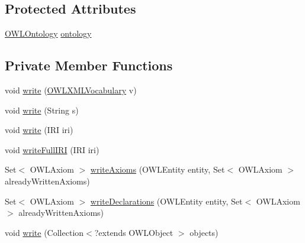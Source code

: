 \subsection*{Protected Attributes}
\begin{DoxyCompactItemize}
\item 
\hyperlink{interfaceorg_1_1semanticweb_1_1owlapi_1_1model_1_1_o_w_l_ontology}{O\-W\-L\-Ontology} \hyperlink{classorg_1_1coode_1_1owlapi_1_1functionalrenderer_1_1_o_w_l_object_renderer_a3f48ba1c8438ae6385bf0964ac3fcb12}{ontology}
\end{DoxyCompactItemize}
\subsection*{Private Member Functions}
\begin{DoxyCompactItemize}
\item 
void \hyperlink{classorg_1_1coode_1_1owlapi_1_1functionalrenderer_1_1_o_w_l_object_renderer_a613b6053f591adee1d4b85b161ccb8af}{write} (\hyperlink{enumorg_1_1semanticweb_1_1owlapi_1_1vocab_1_1_o_w_l_x_m_l_vocabulary}{O\-W\-L\-X\-M\-L\-Vocabulary} v)
\item 
void \hyperlink{classorg_1_1coode_1_1owlapi_1_1functionalrenderer_1_1_o_w_l_object_renderer_add3f553e3322651efa98df472cb96ecd}{write} (String s)
\item 
void \hyperlink{classorg_1_1coode_1_1owlapi_1_1functionalrenderer_1_1_o_w_l_object_renderer_aa4e258019df0e90df6ced0e8cb2e6482}{write} (I\-R\-I iri)
\item 
void \hyperlink{classorg_1_1coode_1_1owlapi_1_1functionalrenderer_1_1_o_w_l_object_renderer_a71ffc68dea9fa4e534041abdf5f13e38}{write\-Full\-I\-R\-I} (I\-R\-I iri)
\item 
Set$<$ O\-W\-L\-Axiom $>$ \hyperlink{classorg_1_1coode_1_1owlapi_1_1functionalrenderer_1_1_o_w_l_object_renderer_a0ade97d7638d42bb59dd58492c67b1d4}{write\-Axioms} (O\-W\-L\-Entity entity, Set$<$ O\-W\-L\-Axiom $>$ already\-Written\-Axioms)
\item 
Set$<$ O\-W\-L\-Axiom $>$ \hyperlink{classorg_1_1coode_1_1owlapi_1_1functionalrenderer_1_1_o_w_l_object_renderer_a3f69751a943f1682b694fe9cb60acd17}{write\-Declarations} (O\-W\-L\-Entity entity, Set$<$ O\-W\-L\-Axiom $>$ already\-Written\-Axioms)
\item 
void \hyperlink{classorg_1_1coode_1_1owlapi_1_1functionalrenderer_1_1_o_w_l_object_renderer_a0b0a2ed85c77cbdda365751a18e9a30c}{write} (Collection$<$?extends O\-W\-L\-Object $>$ objects)
\item 

\end{DoxyCompactItemize}
